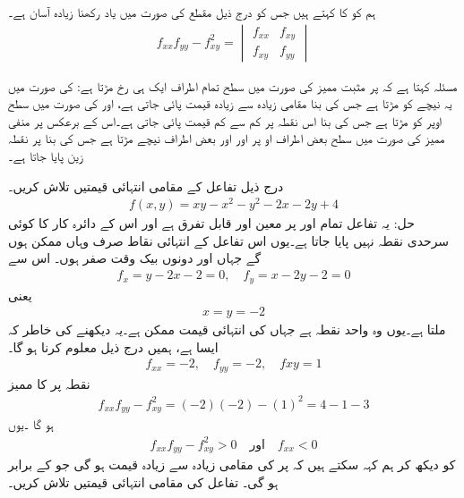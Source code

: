 ہم  کو  کا     کہتے ہیں جس کو درج ذیل مقطع کی  صورت میں  یاد رکھنا زیادہ آسان ہے۔
\begin{align*}
f_{xx}f_{yy}-f_{xy}^2=\begin{vmatrix}f_{xx}&f_{xy}\\ f_{xy}&f_{yy} \end{vmatrix}
\end{align*}

مسئلہ  کہتا ہے کہ  پر  مثبت ممیز کی صورت میں  سطح تمام اطراف ایک ہی رخ مڑتا ہے:   کی صورت میں یہ نیچے کو مڑتا ہے جس کی بنا مقامی زیادہ سے زیادہ قیمت پائی جاتی ہے، اور  کی صورت میں سطح اوپر کو مڑتا ہے جس کی بنا اس نقطہ پر کم سے کم قیمت پائی جاتی ہے۔اس کے برعکس  پر منفی ممیز کی صورت میں  سطح بعض اطراف او  پر اور اور بعض اطراف    نیچے مڑتا ہے جس کی بنا    پر نقطہ زین پایا جاتا ہے۔

درج ذیل تفاعل کے مقامی انتہائی قیمتیں تلاش کریں۔
\begin{align*}
f(x,y)=xy-x^2-y^2-2x-2y+4
\end{align*}
حل:\quad
یہ تفاعل تمام  اور   پر معین اور قابل تفرق ہے اور  اس  کے دائرہ کار کا کوئی سرحدی نقطہ نہیں پایا جاتا ہے۔یوں اس تفاعل کے انتہائی نقاط صرف وہاں    ممکن ہوں گے  جہاں  اور  دونوں بیک وقت  صفر ہوں۔ اس سے
\begin{align*}
f_x=y-2x-2=0,\quad f_y=x-2y-2=0
\end{align*}
یعنی
\begin{align*}
x=y=-2
\end{align*}
ملتا ہے۔یوں   وہ واحد نقطہ ہے جہاں  کی انتہائی قیمت ممکن ہے۔یہ دیکھنے کی خاطر کہ ایسا ہے، ہمیں درج ذیل معلوم کرنا ہو گا۔
\begin{align*}
f_{xx}=-2,\quad f_{yy}=-2,\quad f{xy}=1
\end{align*}
نقطہ  پر  کا ممیز
\begin{align*}
f_{xx}f_{yy}-f_{xy}^2=(-2)(-2)-(1)^2=4-1-3
\end{align*}
ہو گا ۔یوں
\begin{align*}
f_{xx}f_{yy}-f_{xy}^2>0\quad\text{اور}\quad f_{xx}<0
\end{align*}
کو دیکھ کر ہم کہہ سکتے ہیں کہ  پر  کی  مقامی زیادہ سے زیادہ قیمت ہو گی جو  کے برابر ہو گی۔
تفاعل  کی مقامی انتہائی قیمتیں تلاش کریں۔

